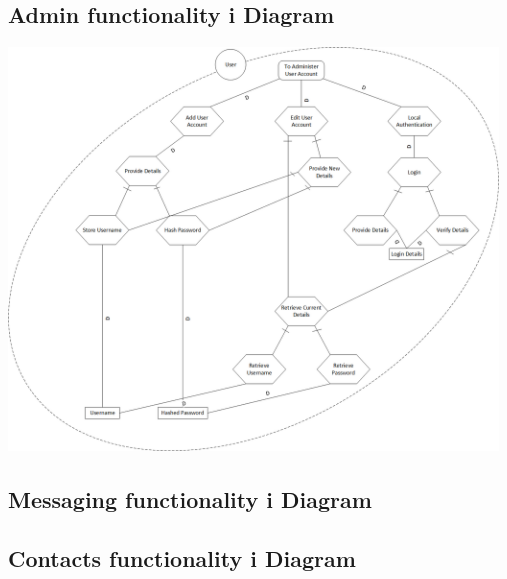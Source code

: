 \subsection*{Admin functionality i\text{*} Diagram}

\begin{center}
 \includegraphics[width=13cm]{diagrams/IStarDiagrams/SMSEncryptionIStarAdmin.png}
\end{center}

\subsection*{Messaging functionality i\text{*} Diagram}

\subsection*{Contacts functionality i\text{*} Diagram}

